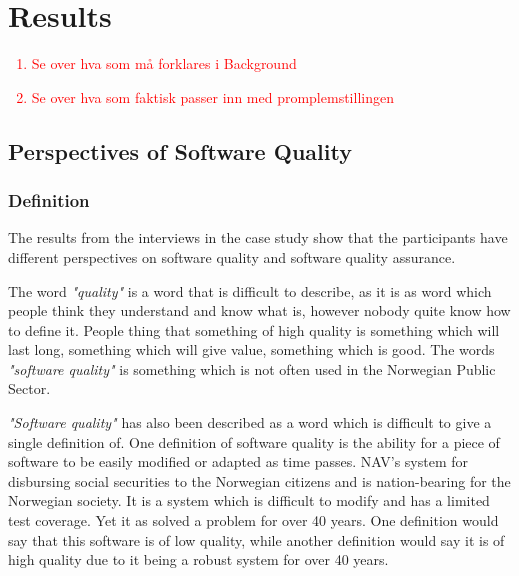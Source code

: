 \chapter{Results}

\textcolor{red}{
\begin{enumerate}
    \item Se over hva som må forklares i Background
    \item Se over hva som faktisk passer inn med promplemstillingen
\end{enumerate}
}

\section{Perspectives of Software Quality}
\subsection{Definition}
The results from the interviews in the case study show that the participants have different perspectives on software quality and software quality assurance.

The word \textit{"quality"} is a word that is difficult to describe, as it is as word which people think they understand and know what is, however nobody quite know how to define it. People thing that something of high quality is something which will last long, something which will give value, something which is good. The words \textit{"software quality"} is something which is not often used in the Norwegian Public Sector.

\textit{"Software quality"} has also been described as a word which is difficult to give a single definition of. One definition of software quality is the ability for a piece of software to be easily modified or adapted as time passes. NAV's system for disbursing social securities to the Norwegian citizens and is nation-bearing for the Norwegian society. It is a system which is difficult to modify and has a limited test coverage. Yet it as solved a problem for over 40 years. One definition would say that this software is of low quality, while another definition would say it is of high quality due to it being a robust system for over 40 years.


